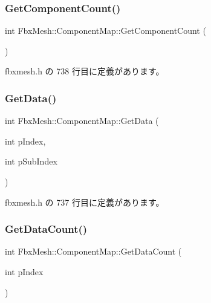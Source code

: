 \subsubsection{\texorpdfstring{Get\+Component\+Count()}{GetComponentCount()}}
{\footnotesize\ttfamily int Fbx\+Mesh\+::\+Component\+Map\+::\+Get\+Component\+Count (\begin{DoxyParamCaption}{ }\end{DoxyParamCaption})\hspace{0.3cm}{\ttfamily [inline]}}



 fbxmesh.\+h の 738 行目に定義があります。

\mbox{\label{struct_fbx_mesh_1_1_component_map_a7fe2d0917dfc8c689704d2e38ed5082f}} 
\subsubsection{\texorpdfstring{Get\+Data()}{GetData()}}
{\footnotesize\ttfamily int Fbx\+Mesh\+::\+Component\+Map\+::\+Get\+Data (\begin{DoxyParamCaption}\item[{int}]{p\+Index,  }\item[{int}]{p\+Sub\+Index }\end{DoxyParamCaption})\hspace{0.3cm}{\ttfamily [inline]}}



 fbxmesh.\+h の 737 行目に定義があります。

\mbox{\label{struct_fbx_mesh_1_1_component_map_a8aa6116c655638c97e9a769262bccbaa}} 
\subsubsection{\texorpdfstring{Get\+Data\+Count()}{GetDataCount()}}
{\footnotesize\ttfamily int Fbx\+Mesh\+::\+Component\+Map\+::\+Get\+Data\+Count (\begin{DoxyParamCaption}\item[{int}]{p\+Index }\end{DoxyParamCaption})\hspace{0.3cm}{\ttfamily [inline]}}



